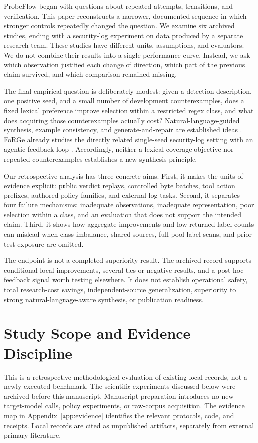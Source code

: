 \documentclass[10pt,twocolumn,letterpaper]{article}
\begin{document}
ProbeFlow began with questions about repeated attempts, transitions, and verification. This paper reconstructs a narrower, documented sequence in which stronger controls repeatedly changed the question. We examine six archived studies, ending with a security-log experiment on data produced by a separate research team. These studies have different units, assumptions, and evaluators. We do not combine their results into a single performance curve. Instead, we ask which observation justified each change of direction, which part of the previous claim survived, and which comparison remained missing.

The final empirical question is deliberately modest: given a detection description, one positive seed, and a small number of development counterexamples, does a fixed lexical preference improve selection within a restricted regex class, and what does acquiring those counterexamples actually cost? Natural-language-guided synthesis, example consistency, and generate-and-repair are established ideas \cite{kushman2013,regel2020,sketchregex2020,transregex2021,opsynth2021}. FoRGe already studies the directly related single-seed security-log setting with an agentic feedback loop \cite{forge2026}. Accordingly, neither a lexical coverage objective nor repeated counterexamples establishes a new synthesis principle.

Our retrospective analysis has three concrete aims. First, it makes the units of evidence explicit: public verdict replays, controlled byte batches, tool action prefixes, authored policy families, and external log tasks. Second, it separates four failure mechanisms: inadequate observations, inadequate representation, poor selection within a class, and an evaluation that does not support the intended claim. Third, it shows how aggregate improvements and low returned-label counts can mislead when class imbalance, shared sources, full-pool label scans, and prior test exposure are omitted.

The endpoint is not a completed superiority result. The archived record supports conditional local improvements, several ties or negative results, and a post-hoc feedback signal worth testing elsewhere. It does not establish operational safety, total research-cost savings, independent-source generalization, superiority to strong natural-language-aware synthesis, or publication readiness.

\section{Study Scope and Evidence Discipline}
\label{sec:scope}
This is a retrospective methodological evaluation of existing local records, not a newly executed benchmark. The scientific experiments discussed below were archived before this manuscript. Manuscript preparation introduces no new target-model calls, policy experiments, or raw-corpus acquisition. The evidence map in Appendix~\ref{app:evidence} identifies the relevant protocols, code, and receipts. Local records are cited as unpublished artifacts, separately from external primary literature.
\end{document}
